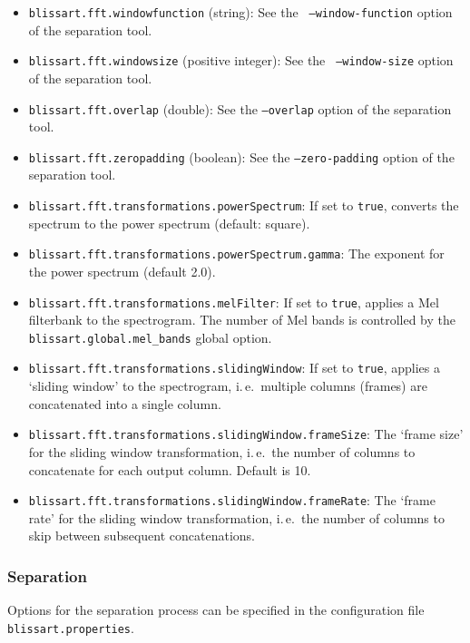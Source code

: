 \begin{itemize}
  \item {\tt blissart.fft.windowfunction} (string): See the {\tt
      --window-function} option of the separation tool.
  \item {\tt blissart.fft.windowsize} (positive integer): See the {\tt
      --window-size} option of the separation tool.
  \item {\tt blissart.fft.overlap} (double): See the {\tt --overlap} option of
    the separation tool.
  \item {\tt blissart.fft.zeropadding} (boolean): See the {\tt --zero-padding}
    option of the separation tool.
  \item {\tt blissart.fft.transformations.powerSpectrum}: 
        If set to {\tt true}, converts the spectrum to the power spectrum (default: square).
  \item {\tt blissart.fft.transformations.powerSpectrum.gamma}: 
        The exponent for the power spectrum (default 2.0).
  \item {\tt blissart.fft.transformations.melFilter}: 
        If set to {\tt true}, applies a Mel filterbank to the spectrogram.
        The number of Mel bands is controlled by the
        {\tt blissart.global.mel\_bands} global option.
  \item {\tt blissart.fft.transformations.slidingWindow}: 
        If set to {\tt true}, applies a `sliding window' to the spectrogram, i.\,e.\ multiple
        columns (frames) are concatenated into a single column.
  \item {\tt blissart.fft.transformations.slidingWindow.frameSize}: 
        The `frame size' for the sliding window transformation, i.\,e.\ the
        number of columns to concatenate for each output column. Default is 10.
  \item {\tt blissart.fft.transformations.slidingWindow.frameRate}: 
        The `frame rate' for the sliding window transformation, i.\,e.\ the
        number of columns to skip between subsequent concatenations.
\end{itemize}
 
  
\subsubsection{Separation}

Options for the separation process can be specified in the
configuration file {\tt blissart.properties}.

